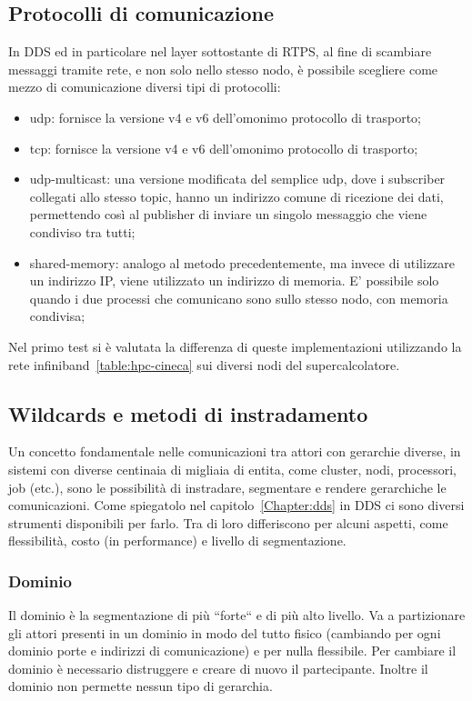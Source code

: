 \subsection{Protocolli di comunicazione}
In DDS ed in particolare nel layer sottostante di RTPS, al fine di scambiare messaggi tramite rete, e non solo nello stesso nodo, è possibile scegliere come mezzo di comunicazione diversi tipi di protocolli:
\begin{itemize}
    \item udp: fornisce la versione v4 e v6 dell'omonimo protocollo di trasporto;
    \item tcp: fornisce la versione v4 e v6 dell'omonimo protocollo di trasporto;
    \item udp-multicast: una versione modificata del semplice udp, dove i subscriber collegati allo stesso topic, hanno un indirizzo comune di ricezione dei dati, permettendo così al publisher di inviare un singolo messaggio che viene condiviso tra tutti;
    \item shared-memory: analogo al metodo precedentemente, ma invece di utilizzare un indirizzo IP, viene utilizzato un indirizzo di memoria. E' possibile solo quando i due processi che comunicano sono sullo stesso nodo, con memoria condivisa;
\end{itemize}

Nel primo test si è valutata la differenza di queste implementazioni utilizzando la rete infiniband~\ref{table:hpc-cineca} sui diversi nodi del supercalcolatore. 

\subsection{Wildcards e metodi di instradamento}
Un concetto fondamentale nelle comunicazioni tra attori con gerarchie diverse, in sistemi con diverse centinaia di migliaia di entita, come cluster, nodi, processori, job (etc.), sono le possibilità di instradare, segmentare e rendere gerarchiche le comunicazioni. Come spiegatolo nel capitolo~\ref{Chapter:dds} in DDS ci sono diversi strumenti disponibili per farlo. Tra di loro differiscono per alcuni aspetti, come flessibilità, costo (in performance) e livello di segmentazione.

\subsubsection{Dominio} 
Il dominio è la segmentazione di più ``forte`` e di più alto livello. Va a partizionare gli attori presenti in un dominio in modo del tutto fisico (cambiando per ogni dominio porte e indirizzi di comunicazione) e per nulla flessibile. Per cambiare il dominio è necessario distruggere e creare di nuovo il partecipante. Inoltre il dominio non permette nessun tipo di gerarchia.
    
